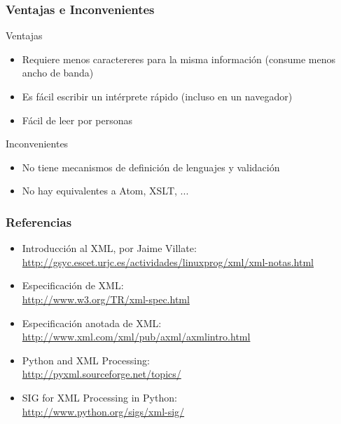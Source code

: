 
\begin{frame}
\frametitle{Ventajas e Inconvenientes}

Ventajas
\begin{itemize}
\item Requiere menos caractereres para la misma información (consume menos ancho de banda)
\item Es fácil escribir un intérprete rápido (incluso en un navegador)
\item Fácil de leer por personas
\end{itemize}

Inconvenientes
\begin{itemize}
\item No tiene mecanismos de definición de lenguajes y validación
\item No hay equivalentes a Atom, XSLT, ...
\end{itemize}
\end{frame}

  

\begin{frame}
\frametitle{Referencias}

\begin{itemize}
\item Introducción al XML, por Jaime Villate: \\
  \url{http://gsyc.escet.urjc.es/actividades/linuxprog/xml/xml-notas.html}
\item Especificación de XML: \\
  \url{http://www.w3.org/TR/xml-spec.html}
\item Especificación anotada de XML: \\
  \url{http://www.xml.com/xml/pub/axml/axmlintro.html}
\item Python and XML Processing: \\
  \url{http://pyxml.sourceforge.net/topics/}
\item SIG for XML Processing in Python: \\
  \url{http://www.python.org/sigs/xml-sig/}
\end{itemize}
\end{frame}



